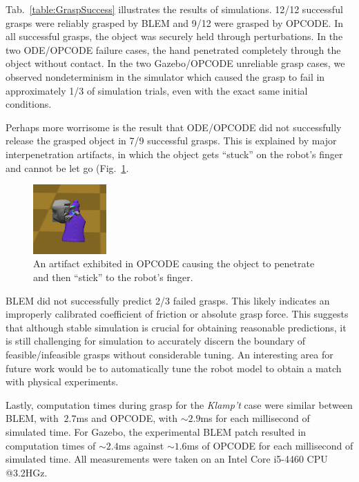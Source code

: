 Tab.~\ref{table:GraspSuccess} illustrates the results of simulations. 12/12 successful grasps were reliably grasped by BLEM and 9/12 were grasped by OPCODE. In all successful grasps, the object was securely held through perturbations.  In the two ODE/OPCODE failure cases, the hand  penetrated completely through the object without contact.  In the two Gazebo/OPCODE unreliable grasp cases, we observed  nondeterminism in the simulator which caused the grasp to fail in approximately 1/3 of simulation trials, even with the exact same initial conditions.

Perhaps more worrisome is the result that ODE/OPCODE did not successfully release the grasped object in 7/9 successful grasps.  This is explained by major interpenetration artifacts, in which the object gets ``stuck'' on the robot's finger and cannot be let go (Fig.~\ref{fig:OPCODEArtifact}. 

\begin{figure}
    \centering
    \includegraphics[width=0.25\textwidth]{images/ssoch/opcode-artifact.png}
    \caption{An artifact exhibited in OPCODE causing the object to penetrate and then ``stick'' to the robot's finger.}
    \label{fig:OPCODEArtifact}
\end{figure}

BLEM did not successfully predict 2/3 failed grasps. This likely indicates an improperly calibrated coefficient of friction or absolute grasp force.  This suggests that although stable simulation is crucial for obtaining reasonable predictions, it is still challenging for simulation to accurately discern the boundary of feasible/infeasible grasps without considerable tuning.   An interesting area for future work would be to automatically tune the robot model to obtain a match with physical experiments.

Lastly, computation times during grasp for the \emph{Klamp't} case were similar between BLEM, with $~2.7$ms and OPCODE, with $\sim2.9$ms for each millisecond of simulated time. For Gazebo, the experimental BLEM patch resulted in computation times of $\sim2.4$ms against $\sim1.6$ms of OPCODE for each millisecond of simulated time. All measurements were taken on an Intel Core i5-4460 CPU @3.2HGz.

